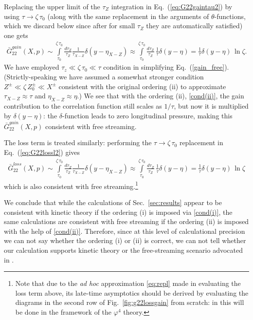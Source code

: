\documentclass[onecolumn,showpacs,nobibnotes,nofootinbib,12pt,aps,prd,showpacs,notitlepage,nofootinbib,preprintnumbers,amsmath,amssymb]{article}
\def\eq#1{{Eq.~(\ref{#1})}}
\def\fig#1{{Fig.~\ref{#1}}}
\begin{document}
Replacing the upper limit of the $\tau_Z$ integration in
\eq{eq:G22gaintau2} by using $\tau \to \zeta \, \tau_0$ (along with
the same replacement in the arguments of $\theta$-functions, which we
discard below since after for small $\tau_Z$ they are automatically
satisfied) one gets
\begin{align}\label{gain_free}
  \bar G_{22}^{gain}(X,p) \sim \int\limits_{\tau_0}^{\zeta \, \tau_0}
  \frac{d\tau_Z}{\tau_Z}\frac{1}{\tau_{X-Z}}\delta(y-\eta_{X-Z})
  \approx \int\limits_{\tau_0}^{\zeta \, \tau_0}
  \frac{d\tau_Z}{\tau_Z}\, \frac{1}{\tau}\delta(y-\eta) =
  \frac{1}{\tau}\delta(y-\eta) \, \ln \zeta.
\end{align}
We have employed $\tau_z \ll \zeta \, \tau_0 \ll \tau$ condition in
simplifying \eq{gain_free}. (Strictly-speaking we have assumed a
somewhat stronger condition $Z^\pm \ll \zeta \, Z_0^\pm \ll X^\pm$
consistent with the original ordering (ii) to approximate $\tau_{X-Z}
\approx \tau$ and $\eta_{X-Z} \approx \eta$.) We see that with the
ordering (ii), \eqref{cond(ii)}, the gain contribution to the
correlation function still scales as $1/\tau$, but now it is
multiplied by $\delta(y-\eta)$: the $\delta$-function leads to zero
longitudinal pressure, making this $\bar G_{22}^{gain}(X,p)$
consistent with free streaming.

The loss term is treated similarly: performing the $\tau \to \zeta \,
\tau_0$ replacement in \eq{eq:G22lossl2} gives
\begin{align}\label{loss_free}
  \bar G_{22}^{loss}(X,p) \sim \int\limits_{\tau_0}^{\zeta \, \tau_0}
  \frac{d\tau_Z}{\tau_Z}\frac{1}{\tau_{X-Z}}\delta(y-\eta_{X-Z})
  \approx \int\limits_{\tau_0}^{\zeta \, \tau_0}
  \frac{d\tau_Z}{\tau_Z}\, \frac{1}{\tau}\delta(y-\eta) =
  \frac{1}{\tau}\delta(y-\eta) \, \ln \zeta
\end{align}
which is also consistent with free streaming.\footnote{Note that due
  to the {\sl ad hoc} approximation \eqref{eq:repl} made in evaluating
  the loss term above, its late-time asymptotics should be derived by
  evaluating the diagrams in the second row of \fig{fig:g22lossgain}
  from scratch: in \cite{KovchegovWu} this will be done in the
  framework of the $\varphi^4$ theory.}

We conclude that while the calculations of Sec.~\ref{sec:results}
appear to be consistent with kinetic theory if the ordering (i) is
imposed via \eqref{cond(i)}, the same calculations are consistent with
free streaming if the ordering (ii) is imposed with the help of
\eqref{cond(ii)}. Therefore, since at this level of calculational
precision we can not say whether the ordering (i) or (ii) is correct,
we can not tell whether our calculation supports kinetic theory or the
free-streaming scenario advocated in \cite{Kovchegov:2005ss}.
\end{document}
